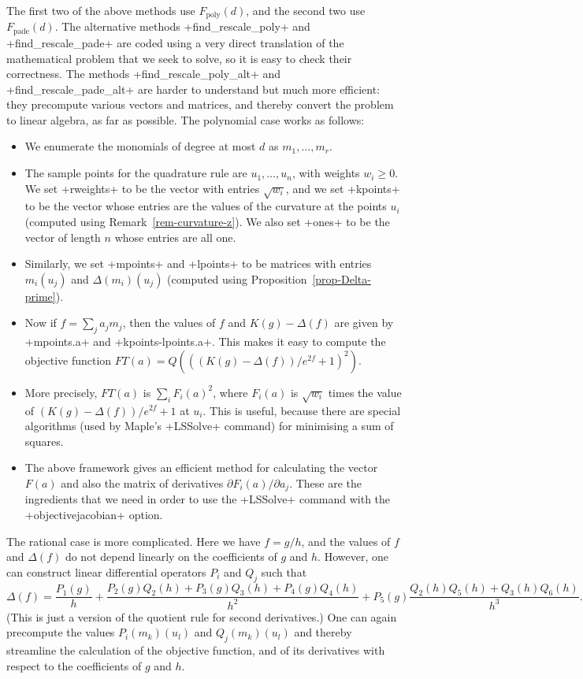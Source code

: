 \documentclass[reqno]{amsart}
\renewcommand{\:}{\colon}
\theoremstyle{definition}
\begin{document}
The first two of the above methods use $F_{\text{poly}}(d)$, and the
second two use $F_{\text{pade}}(d)$.  The alternative methods
\mcode+find_rescale_poly+ and \mcode+find_rescale_pade+ are coded
using a very direct translation of the mathematical problem that we
seek to solve, so it is easy to check their correctness.  The methods
\mcode+find_rescale_poly_alt+ and \mcode+find_rescale_pade_alt+ are
harder to understand but much more efficient: they precompute various
vectors and matrices, and thereby convert the problem to linear
algebra, as far as possible.  The polynomial case works as follows:
\begin{itemize}
 \item We enumerate the monomials of degree at most $d$ as
  $m_1,\dotsc,m_r$.
 \item The sample points for the quadrature rule are $u_1,\dotsc,u_n$,
  with weights $w_i\geq 0$.  We set \mcode+rweights+ to be the vector
  with entries $\sqrt{w_i}$, and we set \mcode+kpoints+ to be the
  vector whose entries are the values of the curvature at the points
  $u_i$ (computed using Remark~\ref{rem-curvature-z}).  We also set
  \mcode+ones+ to be the vector of length $n$ whose entries are all
  one.
 \item Similarly, we set \mcode+mpoints+ and \mcode+lpoints+ to be
  matrices with entries $m_i(u_j)$ and $\Delta(m_i)(u_j)$ (computed
  using Proposition~\ref{prop-Delta-prime}).
 \item Now if $f=\sum_ja_jm_j$, then the values of $f$ and
  $K(g)-\Delta(f)$ are given by \mcode+mpoints.a+ and
  \mcode+kpoints-lpoints.a+.  This makes it easy to compute the
  objective function $FT(a)=Q(((K(g)-\Delta(f))/e^{2f}+1)^2)$.
 \item More precisely, $FT(a)$ is $\sum_iF_i(a)^2$, where $F_i(a)$ is
  $\sqrt{w_i}$ times the value of $(K(g)-\Delta(f))/e^{2f}+1$ at
  $u_i$.  This is useful, because there are special algorithms (used
  by Maple's \mcode+LSSolve+ command) for minimising a sum of
  squares.
 \item The above framework gives an efficient method for calculating
  the vector $F(a)$ and also the matrix of derivatives
  $\partial F_i(a)/\partial a_j$.  These are the ingredients that we
  need in order to use the \mcode+LSSolve+ command with the
  \mcode+objectivejacobian+ option.
\end{itemize}

The rational case is more complicated.  Here we have $f=g/h$, and the
values of $f$ and $\Delta(f)$ do not depend linearly on the
coefficients of $g$ and $h$.  However, one can construct linear
differential operators $P_i$ and $Q_j$ such that
\[ \Delta(f) =
    \frac{P_1(g)}{h} +
    \frac{P_2(g)Q_2(h)+P_3(g)Q_3(h)+P_4(g)Q_4(h)}{h^2} +
    P_5(g)\frac{Q_2(h)Q_5(h)+Q_3(h)Q_6(h)}{h^3}.
\]
(This is just a version of the quotient rule for second derivatives.)
One can again precompute the values $P_i(m_k)(u_l)$ and
$Q_j(m_k)(u_l)$ and thereby streamline the calculation of the
objective function, and of its derivatives with respect to the
coefficients of $g$ and $h$.
\end{document}
